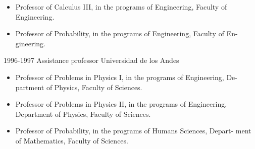 \begin{entrylist}
  \entry
        {}
	      {}
	      {}
	{\begin{itemize}
              \item Professor of Calculus III, in the programs of Engineering, Faculty of
Engineering.
              \item Professor of Probability, in the programs of Engineering, Faculty of En-
gineering.
	\end{itemize}}

  \entry
        {1996-1997}
	{Assistance professor}
	{Universidad de los Andes}
	{\begin{itemize}
              \item Professor of Problems in Physics I, in the programs of Engineering, De-
partment of Physics, Faculty of Sciences.
              \item Professor of Problems in Physics II, in the programs of Engineering,
Department of Physics, Faculty of Sciences.
              \item Professor of Probability, in the programs of Humans Sciences, Depart-
ment of Mathematics, Faculty of Sciences.
	\end{itemize}}
\end{entrylist}
